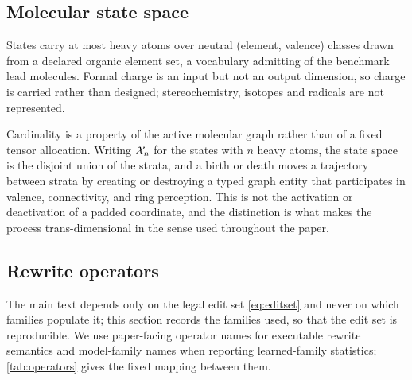 \subsection{Molecular state space}

States carry at most \XXX{} heavy atoms over \XXX{} neutral (element, valence) classes drawn from a declared organic element set, a vocabulary admitting \XXX{} of the benchmark lead molecules.
Formal charge is an input but not an output dimension, so charge is carried rather than designed; stereochemistry, isotopes and radicals are not represented.

Cardinality is a property of the active molecular graph rather than of a fixed tensor allocation. Writing $\mathcal{X}_n$ for the states with $n$ heavy atoms, the state space is the disjoint union of the strata, and a birth or death moves a trajectory between strata by creating or destroying a typed graph entity that participates in valence, connectivity, and ring perception. This is not the activation or deactivation of a padded coordinate, and the distinction is what makes the process trans-dimensional in the sense used throughout the paper.

\subsection{Rewrite operators}
\label{app:operators}

The main text depends only on the legal edit set \eqref{eq:editset} and never on which families populate it; this section records the families used, so that the edit set is reproducible. We use paper-facing operator names for executable rewrite semantics and model-family names when reporting learned-family statistics; \cref{tab:operators} gives the fixed mapping between them.

